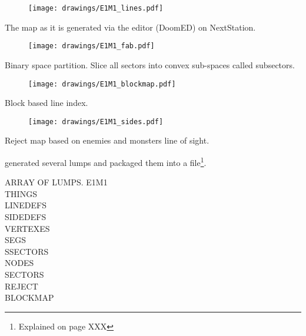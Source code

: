 \pagebreak
\par
\begin{figure}[H]
\centering
\texttt{[image: drawings/E1M1\_lines.pdf]}
\end{figure}
\par
The map as it is generated via the editor (DoomED) on NextStation.\\
\par
\begin{figure}[H]
\centering
\texttt{[image: drawings/E1M1\_fab.pdf]}
\end{figure}
\par
Binary space partition. Slice all sectors into convex sub-spaces called subsectors.\\
\par
\begin{figure}[H]
\centering
\texttt{[image: drawings/E1M1\_blockmap.pdf]}
\end{figure}
\par
Block based line index.\\
\par
\begin{figure}[H]
\centering
\texttt{[image: drawings/E1M1\_sides.pdf]}
\end{figure}
\par
Reject map based on enemies and monsters line of sight.\\


\pagebreak
{}
\par
{} generated several lumps and packaged them into a  file\footnote{Explained on page XXX}.
\par
ARRAY OF LUMPS.
E1M1\\
THINGS\\
LINEDEFS\\
SIDEDEFS\\
VERTEXES\\
SEGS\\
SSECTORS\\
NODES\\
SECTORS\\
REJECT\\
BLOCKMAP\\

\par
{}
\par
